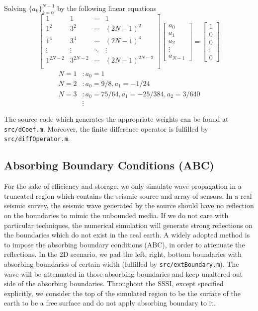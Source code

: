 \documentclass[12pt]{article}
\theoremstyle{plain}
\theoremstyle{definition}
\theoremstyle{remark}
\numberwithin{equation}{section}
\begin{document}
Solving $\{a_k\}_{k=0}^{N-1}$ by the following linear equations
\begin{equation*}
\begin{bmatrix}
  1 & 1 & \cdots & 1 \\
  1^2 & 3^2 & \cdots & (2N-1)^2 \\
  1^4 & 3^4 & \cdots & (2N-1)^4 \\
  \vdots & \vdots & \ddots & \vdots \\
  1^{2N-2} & 3^{2N-2} & \cdots & (2N-1)^{2N-2} \\
\end{bmatrix}
\begin{bmatrix}
  a_0 \\ a_1 \\ a_2 \\ \vdots \\ a_{N-1}
\end{bmatrix}
=
\begin{bmatrix}
  1 \\ 0 \\ 0 \\ \vdots \\ 0
\end{bmatrix}
\end{equation*}
\begin{equation*}
  \begin{aligned}
  N = 1&: a_0 = 1\\
  N = 2&: a_0 = 9/8, a_1 = -1/24\\
  N = 3&: a_0 = 75/64, a_1 = -25/384, a_2 = 3/640\\
  &\vdots
  \end{aligned}
\end{equation*}

The source code which generates the appropriate weights can be found at \texttt{src/dCoef.m}. Moreover, the finite difference operator is fulfilled by \texttt{src/diffOperator.m}. 


\subsection{Absorbing Boundary Conditions (ABC)}
For the sake of efficiency and storage, we only simulate wave propagation in a truncated region which contains the seismic source and array of sensors. In a real seismic survey, the seismic wave generated by the source should have no reflection on the boundaries to mimic the unbounded media. If we do not care with particular techniques, the numerical simulation will generate strong reflections on the boundaries which do not exist in the real earth. A widely adopted method is to impose the absorbing boundary conditions (ABC), in order to attenuate the reflections. In the 2D scenario, we pad the left, right, bottom boundaries with absorbing boundaries of certain width (fulfilled by \texttt{src/extBoundary.m}). The wave will be attenuated in those absorbing boundaries and keep unaltered out side of the absorbing boundaries. Throughout the SSSI, except specified explicitly, we consider the top of the simulated region to be the surface of the earth to be a free surface and do not apply absorbing boundary to it.
\end{document}
